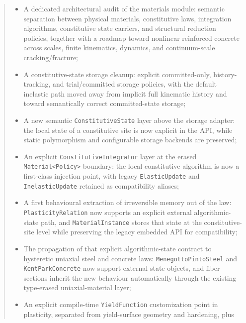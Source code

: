 \documentclass[11pt,a4paper]{report}
\theoremstyle{definition}
\begin{document}
\begin{abstract}
\begin{itemize}[nosep]
        first an elastic baseline, and then a materially nonlinear
        reinforced-concrete continuation with fiber sections in the frame,
        elastic MITC4 slabs, incremental SNES solution, and multi-block
        structural VTK export including fiber-level fields;
  \item A dedicated architectural audit of the materials module: semantic
        separation between physical materials, constitutive laws, integration
        algorithms, constitutive state carriers, and structural reduction
        policies, together with a roadmap toward nonlinear reinforced
        concrete across scales, finite kinematics, dynamics, and
        continuum-scale cracking/fracture;
  \item A constitutive-state storage cleanup: explicit committed-only,
        history-tracking, and trial/committed storage policies, with the
        default inelastic path moved away from implicit full kinematic
        history and toward semantically correct committed-state storage;
  \item A new semantic \texttt{ConstitutiveState} layer above the storage
        adapter: the local state of a constitutive site is now explicit in the
        API, while static polymorphism and configurable storage backends are
        preserved;
  \item An explicit \texttt{ConstitutiveIntegrator} layer at the erased
        \texttt{Material<Policy>} boundary: the local constitutive algorithm is
        now a first-class injection point, with legacy \texttt{ElasticUpdate}
        and \texttt{InelasticUpdate} retained as compatibility aliases;
  \item A first behavioural extraction of irreversible memory out of the law:
        \texttt{PlasticityRelation} now supports an explicit external
        algorithmic-state path, and \texttt{MaterialInstance} stores that state
        at the constitutive-site level while preserving the legacy embedded
        API for compatibility;
  \item The propagation of that explicit algorithmic-state contract to
        hysteretic uniaxial steel and concrete laws: \texttt{MenegottoPintoSteel}
        and \texttt{KentParkConcrete} now support external state objects, and
        fiber sections inherit the new behaviour automatically through the
        existing type-erased uniaxial-material layer;
  \item An explicit compile-time \texttt{YieldFunction} customization point in        plasticity, separated from yield-surface geometry and hardening, plus

\end{itemize}
\end{abstract}
\end{document}
